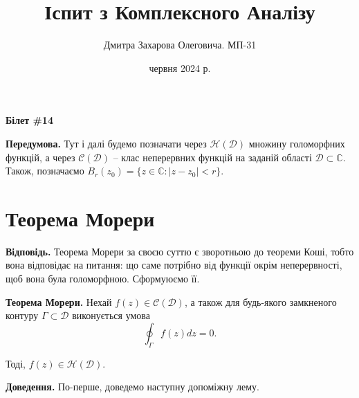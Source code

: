 \documentclass[14pt]{extarticle}
\title{\huge\sffamily\bfseries Іспит з Комплексного Аналізу}
\author{\Large\sffamily Дмитра Захарова Олеговича. МП-31}
\date{\sffamily 3 червня 2024 р.}
\newcommand{\<}{\langle}
\renewcommand{\>}{\rangle}
\theoremstyle{mystyle}{\newtheorem{definition}{Definition}[section]}
\theoremstyle{mystyle}{\newtheorem{proposition}[definition]{Proposition}}
\theoremstyle{mystyle}{\newtheorem{theorem}[definition]{Theorem}}
\theoremstyle{mystyle}{\newtheorem{lemma}[definition]{Lemma}}
\theoremstyle{mystyle}{\newtheorem{corollary}[definition]{Corollary}}
\theoremstyle{mystyle}{\newtheorem*{remark}{Remark}}
\theoremstyle{mystyle}{\newtheorem*{remarks}{Remarks}}
\theoremstyle{mystyle}{\newtheorem*{example}{Example}}
\theoremstyle{mystyle}{\newtheorem*{examples}{Examples}}
\theoremstyle{definition}{\newtheorem*{exercise}{Exercise}}
\theoremstyle{cstyle}{\newtheorem*{cthm}{}}
\theoremstyle{warn}
\begin{document}
\maketitle


\begin{center}
    \textbf{Білет \#14}
\end{center}

\begin{tcolorbox}[title=Вміст, fonttitle=\sffamily\bfseries\selectfont,interior style={left color=contcol1!40!white,right color=contcol2!40!white},frame style={left color=contcol1!80!white,right color=contcol2!80!white},coltitle=black,top=2mm,bottom=2mm,left=2mm,right=2mm,drop fuzzy shadow,enhanced,breakable]
\makeatletter
{}
\makeatother
\end{tcolorbox}

\newpage

\textbf{Передумова.} Тут і далі будемо позначати через $\mathcal{H}(\mathcal{D})$  множину голоморфних функцій, а через $\mathcal{C}(\mathcal{D})$ -- клас неперервних функцій на заданій області $\mathcal{D} \subset \mathbb{C}$. Також, позначаємо $B_r(z_0) = \{z \in \mathbb{C}: |z-z_0|<r\}$.

\section{Теорема Морери}

\textbf{Відповідь.} Теорема Морери за своєю суттю є зворотньою до теореми Коші, тобто вона відповідає на питання: що саме потрібно від функції окрім неперервності, щоб вона була голоморфною. Сформуюємо її.

\begin{theorem}
\textbf{Теорема Морери.} Нехай $f(z) \in \mathcal{C}(\mathcal{D})$, а також для будь-якого замкненого контуру $\Gamma \subset \mathcal{D}$ виконується умова
\begin{equation}
    \oint_{\Gamma} f(z)dz = 0.
\end{equation}

Тоді, $f(z) \in \mathcal{H}(\mathcal{D})$.
\end{theorem}

\textbf{Доведення.} По-перше, доведемо наступну допоміжну лему.
\end{document}

